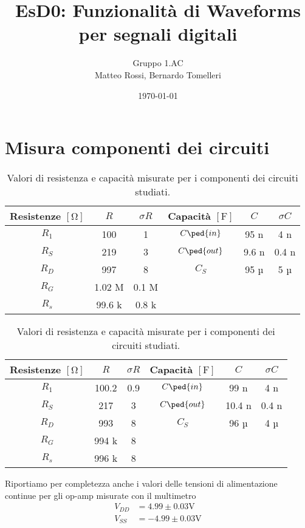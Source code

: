 \documentclass[10pt, a4paper, italian]{article}
\author{Gruppo 1.AC \\ Matteo Rossi, Bernardo Tomelleri}
\title{EsD0: Funzionalità di Waveforms per segnali digitali}
\begin{document}
\date{\today}
\maketitle

\setcounter{section}{0}

\section{Misura componenti dei circuiti}
\begin{table}[htbp]
\centering
\begin{tabular}{cccccc}
\toprule
Resistenze $[\si{\ohm}]$ & $R$ & $\sigma R$ & Capacità $[\si{\F}]$ & $C$ &
$\sigma C$ \\
\midrule
\midrule
$R_1$	  & 100 	& 1 	 & $C\ped{in}$ & 95	n	 & 4 n \\
$R_S$	  & 219	& 3 	 & $C\ped{out}$ & 9.6 n	 & 0.4 n \\
$R_D$	  & 997		& 8	 	 & $C_S$ 		& 95  µ  & 5 µ \\
$R_G$	  & 1.02 M	& 0.1 M	 & & & \\
$R_s$	  & 99.6 k	& 0.8 k	 & & & \\
\bottomrule     
\end{tabular}
\caption{Valori di resistenza e capacità misurate per i componenti dei
circuiti studiati. \label{tab: rcmes_M}}
\end{table}

\begin{table}[htbp]
\centering
\begin{tabular}{cccccc}
\toprule
Resistenze $[\si{\ohm}]$ & $R$ & $\sigma R$ & Capacità $[\si{\F}]$ & $C$ &
$\sigma C$ \\
\midrule
\midrule
$R_1$	  & 100.2 	& 0.9 	 & $C\ped{in}$ & 99	n	 & 4 n \\
$R_S$	  & 217	& 3 	 & $C\ped{out}$ & 10.4 n	 & 0.4 n \\
$R_D$	  & 993		& 8	 	 & $C_S$ 		& 96  µ  & 4 µ \\
$R_G$	  & 994 k	& 8	 & & & \\
$R_s$	  & 996 k	& 8	 & & & \\
\bottomrule     
\end{tabular}
\caption{Valori di resistenza e capacità misurate per i componenti dei
circuiti studiati. \label{tab: rcmes_B}}
\end{table}

Riportiamo per completezza anche i valori delle tensioni di alimentazione
continue per gli op-amp misurate con il multimetro
\begin{align*}
V_{DD} &= 4.99 \pm 0.03 \si{\V} \\
V_{SS} &= -4.99 \pm 0.03 \si{\V}
\end{align*}
\end{document}
